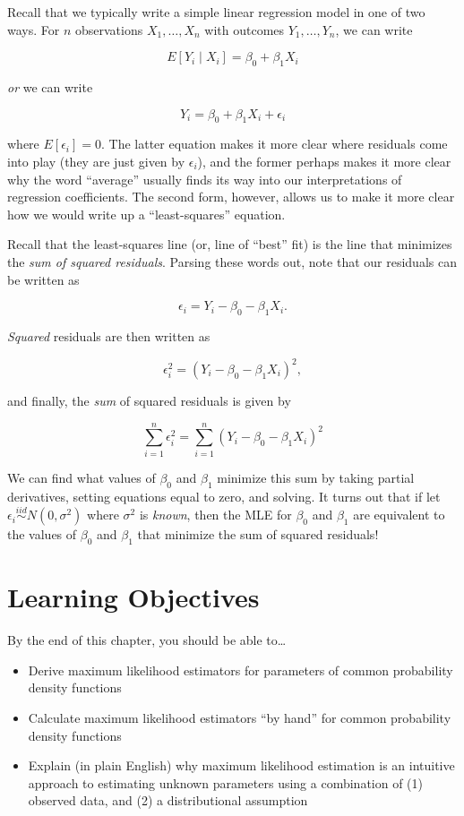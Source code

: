 \documentclass[
  letterpaper,
  DIV=11,
  numbers=noendperiod]{scrreprt}
\begin{document}
Recall that we typically write a simple linear regression model in one
of two ways. For \(n\) observations \(X_1, \dots, X_n\) with outcomes
\(Y_1, \dots, Y_n\), we can write

\[
E[Y_i \mid X_i] = \beta_0 + \beta_1 X_i
\]

\emph{or} we can write

\[
Y_i = \beta_0 + \beta_1 X_i + \epsilon_i
\]

where \(E[\epsilon_i] = 0\). The latter equation makes it more clear
where residuals come into play (they are just given by \(\epsilon_i\)),
and the former perhaps makes it more clear why the word ``average''
usually finds its way into our interpretations of regression
coefficients. The second form, however, allows us to make it more clear
how we would write up a ``least-squares'' equation.

Recall that the least-squares line (or, line of ``best'' fit) is the
line that minimizes the \emph{sum of squared residuals}. Parsing these
words out, note that our residuals can be written as

\[
\epsilon_i = Y_i - \beta_0 - \beta_1 X_i.
\]

\emph{Squared} residuals are then written as

\[
\epsilon_i^2 = (Y_i - \beta_0 - \beta_1 X_i)^2,
\]

and finally, the \emph{sum} of squared residuals is given by

\[
\sum_{i = 1}^n \epsilon_i^2 = \sum_{i = 1}^n (Y_i - \beta_0 - \beta_1 X_i)^2
\]

We can find what values of \(\beta_0\) and \(\beta_1\) minimize this sum
by taking partial derivatives, setting equations equal to zero, and
solving. It turns out that if let
\(\epsilon_i \overset{iid}{\sim} N(0, \sigma^2)\) where \(\sigma^2\) is
\emph{known}, then the MLE for \(\beta_0\) and \(\beta_1\) are
equivalent to the values of \(\beta_0\) and \(\beta_1\) that minimize
the sum of squared residuals!

\section{Learning Objectives}\label{learning-objectives-1}

By the end of this chapter, you should be able to\ldots{}

\begin{itemize}
\item
  Derive maximum likelihood estimators for parameters of common
  probability density functions
\item
  Calculate maximum likelihood estimators ``by hand'' for common
  probability density functions
\item
  Explain (in plain English) why maximum likelihood estimation is an
  intuitive approach to estimating unknown parameters using a
  combination of (1) observed data, and (2) a distributional assumption
\end{itemize}
\end{document}
